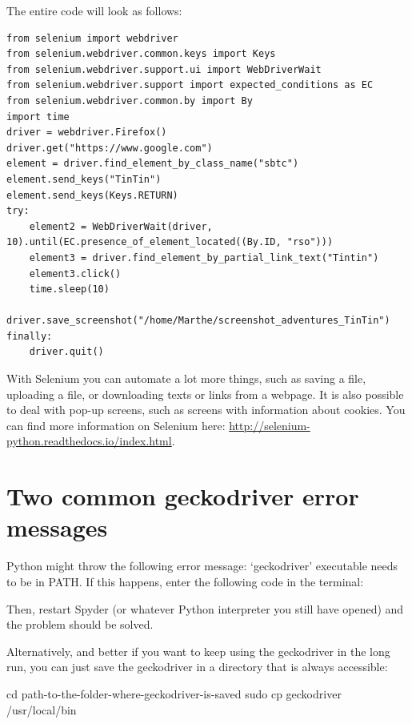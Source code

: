 \documentclass[a4paper,12pt]{book}
\begin{document}
\begin{appendices}
The entire code will look as follows:
\begin{lstlisting}
from selenium import webdriver
from selenium.webdriver.common.keys import Keys
from selenium.webdriver.support.ui import WebDriverWait
from selenium.webdriver.support import expected_conditions as EC 
from selenium.webdriver.common.by import By
import time
driver = webdriver.Firefox()
driver.get("https://www.google.com")  
element = driver.find_element_by_class_name("sbtc")
element.send_keys("TinTin")
element.send_keys(Keys.RETURN)
try:
    element2 = WebDriverWait(driver, 10).until(EC.presence_of_element_located((By.ID, "rso")))
    element3 = driver.find_element_by_partial_link_text("Tintin")
    element3.click()
    time.sleep(10)
    driver.save_screenshot("/home/Marthe/screenshot_adventures_TinTin")
finally:
    driver.quit()
\end{lstlisting}



With Selenium you can automate a lot more things, such as saving a file, uploading a file, or downloading texts or links from a webpage. It is also possible to deal with pop-up screens, such as screens with information about cookies. You can find more information on Selenium here: \url{http://selenium-python.readthedocs.io/index.html}.

\section*{Two common geckodriver error messages}

Python might throw the following error message: ‘geckodriver’ executable needs to be in PATH. If this happens, enter the following code in the terminal:



Then, restart Spyder (or whatever Python interpreter you still have opened) and the problem should be solved.

Alternatively, and better if you want to keep using the geckodriver in the long run, you can just save the geckodriver in a directory that is always accessible:

\begin{lstlistingbash}
cd path-to-the-folder-where-geckodriver-is-saved
sudo cp geckodriver /usr/local/bin
\end{lstlistingbash}




\end{appendices}
\end{document}
